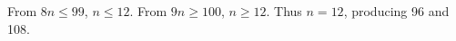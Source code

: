 From $ 8n\le99 $, $ n\le12 $. From $ 9n\ge100 $, $ n\ge12 $. Thus $\boxed{n=12}$, producing 96 and 108.
